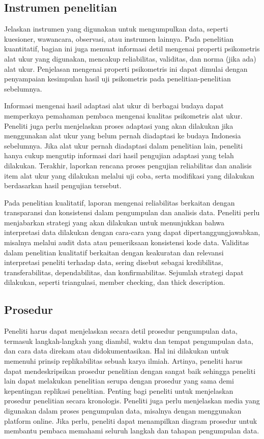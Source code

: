 \documentclass[
  indonesian,
  letterpaper,
]{scrbook}
\begin{document}
\subsection{Instrumen penelitian}\label{instrumen-penelitian}

Jelaskan instrumen yang digunakan untuk mengumpulkan data, seperti
kuesioner, wawancara, observasi, atau instrumen lainnya. Pada penelitian
kuantitatif, bagian ini juga memuat informasi detil mengenai properti
psikometris alat ukur yang digunakan, mencakup reliabilitas, validitas,
dan norma (jika ada) alat ukur. Penjelasan mengenai properti psikometris
ini dapat dimulai dengan penyampaian kesimpulan hasil uji psikometris
pada penelitian-penelitian sebelumnya.

Informasi mengenai hasil adaptasi alat ukur di berbagai budaya dapat
memperkaya pemahaman pembaca mengenai kualitas psikometris alat ukur.
Peneliti juga perlu menjelaskan proses adaptasi yang akan dilakukan jika
menggunakan alat ukur yang belum pernah diadaptasi ke budaya Indonesia
sebelumnya. Jika alat ukur pernah diadaptasi dalam penelitian lain,
peneliti hanya cukup mengutip informasi dari hasil pengujian adaptasi
yang telah dilakukan. Terakhir, laporkan rencana proses pengujian
reliabilitas dan analisis item alat ukur yang dilakukan melalui uji
coba, serta modifikasi yang dilakukan berdasarkan hasil pengujian
tersebut.

Pada penelitian kualitatif, laporan mengenai reliabilitas berkaitan
dengan transparansi dan konsistensi dalam pengumpulan dan analisis data.
Peneliti perlu menjabarkan strategi yang akan dilakukan untuk
menunjukkan bahwa interpretasi data dilakukan dengan cara-cara yang
dapat dipertanggungjawabkan, misalnya melalui audit data atau
pemeriksaan konsistensi kode data. Validitas dalam penelitian kualitatif
berkaitan dengan keakuratan dan relevansi interpretasi peneliti terhadap
data, sering disebut sebagai kredibilitas, transferabilitas,
dependabilitas, dan konfirmabilitas. Sejumlah strategi dapat dilakukan,
seperti triangulasi, member checking, dan thick description.

\subsection{Prosedur}\label{prosedur}

Peneliti harus dapat menjelaskan secara detil prosedur pengumpulan data,
termasuk langkah-langkah yang diambil, waktu dan tempat pengumpulan
data, dan cara data direkam atau didokumentasikan. Hal ini dilakukan
untuk memenuhi prinsip replikabilitas sebuah karya ilmiah. Artinya,
peneliti harus dapat mendeskripsikan prosedur penelitian dengan sangat
baik sehingga peneliti lain dapat melakukan penelitian serupa dengan
prosedur yang sama demi kepentingan replikasi penelitian. Penting bagi
peneliti untuk menjelaskan prosedur penelitian secara kronologis.
Peneliti juga perlu menjelaskan media yang digunakan dalam proses
pengumpulan data, misalnya dengan menggunakan platform online. Jika
perlu, peneliti dapat menampilkan diagram prosedur untuk membantu
pembaca memahami seluruh langkah dan tahapan pengumpulan data.
\end{document}
